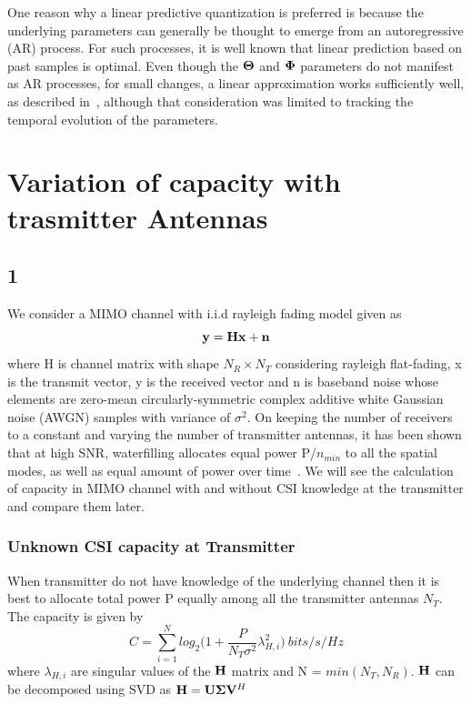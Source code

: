 \documentclass[11pt,a4paper]{report}
\def\bn{{\bf n}}
\def\bx{{\bf x}}
\def\by{{\bf y}}
\def\bSigma{{\bf \Sigma}}
\def\bH{{\bf H}}
\def\bU{{\bf U}}
\def\bV{{\bf V}}
\begin{document}
One reason why a linear predictive quantization is preferred is
because the underlying parameters can generally be thought to emerge
from an autoregressive (AR) process. For such processes, it is well
known that linear prediction based on past samples is optimal. Even
though the $\bf{\Theta}$ and $\bf{\Phi}$ parameters do not manifest as AR
processes, for small changes, a linear approximation works
sufficiently well, as described in~\cite{4114278}, although that
consideration was limited to tracking the temporal evolution of the
parameters.

\chapter{Variation of capacity with trasmitter Antennas}
\label{chap:cap}

\section{1}
\label{sec:1}
We consider a MIMO channel with i.i.d rayleigh fading model given as
\begin{equation}
\by = \bH\bx + \bn
\end{equation}
where H is channel matrix with shape $N_R\times N_T$ considering rayleigh flat-fading,
x is the transmit vector, y is the received vector and n is baseband
noise whose elements are zero-mean circularly-symmetric complex additive 
white Gaussian noise (AWGN) samples with variance of $\sigma^2$.
On keeping
the number of receivers to a constant and varying the number of transmitter
antennas, it has been shown that at high SNR, waterfilling allocates
equal power P/$n_{min}$ to all the spatial modes, as well as equal amount
of power over time~\cite{10.5555/1111206}.
We will see the calculation of capacity in MIMO channel with and without
CSI knowledge at the transmitter and compare them later.

\subsection{Unknown CSI capacity at Transmitter}
When transmitter do not have knowledge of the underlying channel
then it is best to allocate total power P equally among all the 
transmitter antennas $N_T$. The capacity is given by~\cite{Foschini1998, Khalighi2002, 6770094} 
\begin{equation}
C = \sum_{i=1}^{N}log_{2}\big(1 + \frac{P}{N_{T}\sigma^2}\lambda^{2}_{H,i}\big)\: bits/s/Hz
\end{equation}
where $\lambda_{H,i}$ are singular values of the $\bH$ matrix and N = $min(N_T, N_R)$.
$\bH$ can be decomposed using SVD as $\bH = \bU\bSigma\bV^H$
\end{document}
